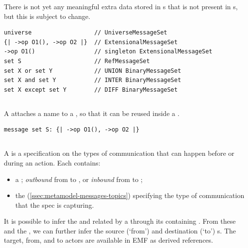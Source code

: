 There is not yet any meaningful extra data stored in
\mgapmessagespec s that is not present in \mmessagespec s, but this is subject
to change.

\begin{lstlisting}[style=Example]
universe                  // UniverseMessageSet
{| ->op O1(), ->op O2 |}  // ExtensionalMessageSet
->op O1()                 // singleton ExtensionalMessageSet
set S                     // RefMessageSet
set X or set Y            // UNION BinaryMessageSet
set X and set Y           // INTER BinaryMessageSet
set X except set Y        // DIFF BinaryMessageSet
\end{lstlisting}

\subsection{\mnamedmessageset}\label{ssec:metamodel-messages-named-sets}

A \mnamedmessageset{} attaches a name to a \mmessageset, so that it can be reused
inside a \msequence.

\begin{lstlisting}[style=Example]
message set S: {| ->op O1(), ->op O2 |}
\end{lstlisting}

\subsection{\mmessagespec}

A \mmessagespec{} is a specification on the types of communication that can
happen before or during an action.  Each \mmessagespec{} contains:

\begin{itemize}
\item
  a \mmessagedirection; \emph{outbound} from \mtarget{} to \mworld,
  or \emph{inbound} from \mworld{} to \mtarget;
\item
  the \mmessagetopic{} (\cref{ssec:metamodel-messages-topics}) specifying
  the type of communication that the spec is capturing.
\end{itemize}

It is possible to infer the \mtarget{} and \mworld{} related by a
\mmessagespec{} through its containing \msequencegroup.  From these
and the \mmessagedirection, we can further infer the source (`from')
and destination (`to') \mactor s.  The target, from, and to actors are
available in EMF as derived references.

